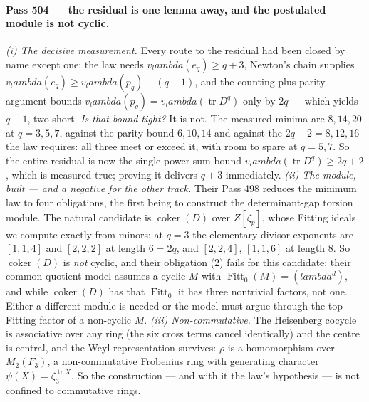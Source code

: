 \documentclass[12pt,a4paper]{article}
\def\mathbb#1{#1}%
\def\textbf#1{#1}%
\def\lambda{lambda}%
\theoremstyle{definition}
\newcommand{\FF}{\mathbb{F}}
\newcommand{\ZZ}{\mathbb{Z}}
\begin{document}
\paragraph{Pass 504 --- the residual is one lemma away, and the postulated
module is not cyclic.}
\emph{(i) The decisive measurement.}  Every route to the residual had been
closed by name except one: the law needs $v_\lambda(e_q)\ge q{+}3$, Newton's
chain supplies $v_\lambda(e_q)\ge v_\lambda(p_q)-(q{-}1)$, and the counting
plus parity argument bounds $v_\lambda(p_q)=v_\lambda(\operatorname{tr}D^q)$
only by $2q$ --- which yields $q{+}1$, two short.  \emph{Is that bound tight?}
It is not.  The measured minima are $8,14,20$ at $q=3,5,7$, against the parity
bound $6,10,14$ and against the $2q{+}2=8,12,16$ the law requires: all three
meet or exceed it, with room to spare at $q=5,7$.  \textbf{So the entire
residual is now the single power-sum bound
$v_\lambda(\operatorname{tr}D^q)\ge2q{+}2$}, which is measured true; proving it
delivers $q{+}3$ immediately.  \emph{(ii) The module, built --- and a negative
for the other track.}  Their Pass 498 reduces the minimum law to four
obligations, the first being to construct the determinant-gap torsion module.
The natural candidate is $\operatorname{coker}(D)$ over $\ZZ[\zeta_p]$, whose
Fitting ideals we compute exactly from minors; at $q=3$ the elementary-divisor
exponents are $[1,1,4]$ and $[2,2,2]$ at length $6=2q$, and $[2,2,4]$, $[1,1,6]$
at length $8$.  \textbf{So $\operatorname{coker}(D)$ is \emph{not} cyclic}, and
their obligation (2) fails for this candidate: their common-quotient model
assumes a cyclic $M$ with $\operatorname{Fitt}_0(M)=(\lambda^d)$, and while
$\operatorname{coker}(D)$ has that $\operatorname{Fitt}_0$ it has three
nontrivial factors, not one.  Either a different module is needed or the model
must argue through the top Fitting factor of a non-cyclic $M$.  \emph{(iii)
Non-commutative.}  The Heisenberg cocycle is associative over any ring (the six
cross terms cancel identically) and the centre is central, and the Weyl
representation survives: $\rho$ is a homomorphism over $M_2(\FF_3)$, a
non-commutative Frobenius ring with generating character
$\psi(X)=\zeta_3^{\operatorname{tr}X}$.  So the construction --- and with it the
law's hypothesis --- is not confined to commutative rings.
\end{document}
